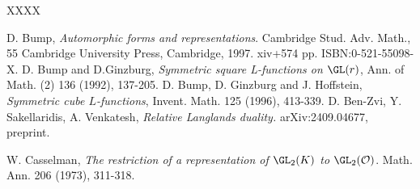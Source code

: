 \documentclass[11pt,reqno]{amsart}
\newcommand{\CO}{{\mathcal {O}}} \newcommand{\CP}{{\mathcal {P}}}
\theoremstyle{plain}
\theoremstyle{remark} \newtheorem{remark}[thm]{Remark}
\theoremstyle{definition} \newtheorem{exercise}[thm]{Exercise}
\theoremstyle{definition} \newtheorem{example}[thm]{Example} \newtheorem{condition}[thm]{Condition}
\numberwithin{equation}{section}
\renewcommand{\-}{\text{--}}
\begin{document}
\begin{thebibliography}{XXXX}

D. Bump, \emph{Automorphic forms and representations}. Cambridge Stud. Adv. Math., 55 Cambridge University Press, Cambridge, 1997. xiv+574 pp. ISBN:0-521-55098-X.
 D. Bump and D.Ginzburg, {\em Symmetric square L-functions on $\GL(r)$}, Ann. of Math. (2) 136 (1992), 137-205.
 D. Bump, D. Ginzburg and J. Hoffstein, {\em Symmetric cube $L$-functions}, Invent. Math. 125 (1996), 413-339.
 D. Ben-Zvi, Y. Sakellaridis, A. Venkatesh, {\em Relative Langlands duality.} arXiv:2409.04677, preprint.

W. Casselman, \emph{The restriction of a representation of $\GL_2(K)$ to $\GL_2(\CO)$}.
Math. Ann. 206 (1973), 311-318.


\end{thebibliography}
\end{document}
